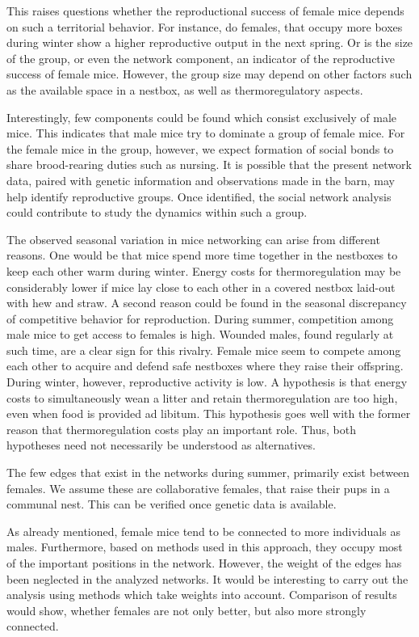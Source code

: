 This raises questions whether the reproductional success of female mice depends on such a territorial behavior. For instance, do females, that occupy more boxes during winter show a higher reproductive output in the next spring. Or is the size of the group, or even the network component, an indicator of the reproductive success of female mice. However, the group size may depend on other factors such as the available space in a nestbox, as well as thermoregulatory aspects.

Interestingly, few components could be found which consist exclusively of male mice. This indicates that male mice try to dominate a group of female mice. For the female mice in the group, however, we expect formation of social bonds to share brood-rearing duties such as nursing. It is possible that the present network data, paired with genetic information and observations made in the barn, may help identify reproductive groups. Once identified, the social network analysis could contribute to study the dynamics within such a group.     

The observed seasonal variation in mice networking can arise from different reasons. One would be that mice spend more time together in the nestboxes to keep each other warm during winter. Energy costs for thermoregulation may be considerably lower if mice lay close to each other in a covered nestbox laid-out with hew and straw. A second reason could be found in the seasonal discrepancy of competitive behavior for reproduction. During summer, competition among male mice to get access to females is high. Wounded males, found regularly at such time, are a clear sign for this rivalry. Female mice seem to compete among each other to acquire and defend safe nestboxes where they raise their offspring. During winter, however, reproductive activity is low. A hypothesis is that energy costs to simultaneously wean a litter and retain thermoregulation are too high, even when food is provided ad libitum. This hypothesis goes well  with the former reason that thermoregulation costs play an important role. Thus, both hypotheses need not necessarily be understood as alternatives.    

The few edges that exist in the networks during summer, primarily exist between females. We assume these are collaborative females, that raise their pups in a communal nest. This can be verified once genetic data is available.

As already mentioned, female mice tend to be connected to more individuals as males. Furthermore, based on methods used in this approach, they occupy most of the important positions in the network. However, the weight of the edges has been neglected in the analyzed networks. It would be interesting to carry out the analysis using methods which take weights into account. Comparison of results would show, whether females are not only better, but also more strongly connected.

